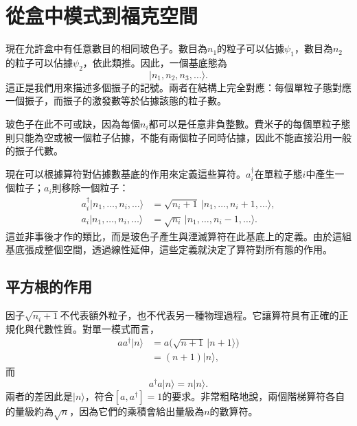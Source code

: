 \begin{classroomqa}
\end{classroomqa}

\section{從盒中模式到福克空間}

現在允許盒中有任意數目的相同玻色子。數目為\(n_1\)的粒子可以佔據\(\psi_1\)，數目為\(n_2\)的粒子可以佔據\(\psi_2\)，依此類推。因此，一個基底態為
\begin{equation}
|n_1,n_2,n_3,\ldots\rangle.
\end{equation}
這正是我們用來描述多個振子的記號。兩者在結構上完全對應：每個單粒子態對應一個振子，而振子的激發數等於佔據該態的粒子數。

玻色子在此不可或缺，因為每個\(n_i\)都可以是任意非負整數。費米子的每個單粒子態則只能為空或被一個粒子佔據，不能有兩個粒子同時佔據，因此不能直接沿用一般的振子代數。

現在可以根據算符對佔據數基底的作用來定義這些算符。\(a_i^\dagger\)在單粒子態\(i\)中產生一個粒子；\(a_i\)則移除一個粒子：
\begin{align}
a_i^\dagger|n_1,\ldots,n_i,\ldots\rangle
&=\sqrt{n_i+1}\,|n_1,\ldots,n_i+1,\ldots\rangle, \\
a_i|n_1,\ldots,n_i,\ldots\rangle
&=\sqrt{n_i}\,|n_1,\ldots,n_i-1,\ldots\rangle.
\end{align}
這並非事後才作的類比，而是玻色子產生與湮滅算符在此基底上的定義。由於這組基底張成整個空間，透過線性延伸，這些定義就決定了算符對所有態的作用。

\begin{classroomqa}
\end{classroomqa}

\subsection{平方根的作用}

因子\(\sqrt{n_i+1}\)不代表額外粒子，也不代表另一種物理過程。它讓算符具有正確的正規化與代數性質。對單一模式而言，
\begin{align}
a a^\dagger|n\rangle
&=a\bigl(\sqrt{n+1}\,|n+1\rangle\bigr) \\
&=(n+1)|n\rangle,
\end{align}
而
\begin{equation}
a^\dagger a|n\rangle=n|n\rangle.
\end{equation}
兩者的差因此是\(|n\rangle\)，符合\([a,a^\dagger]=1\)的要求。非常粗略地說，兩個階梯算符各自的量級約為\(\sqrt n\)，因為它們的乘積會給出量級為\(n\)的數算符。

